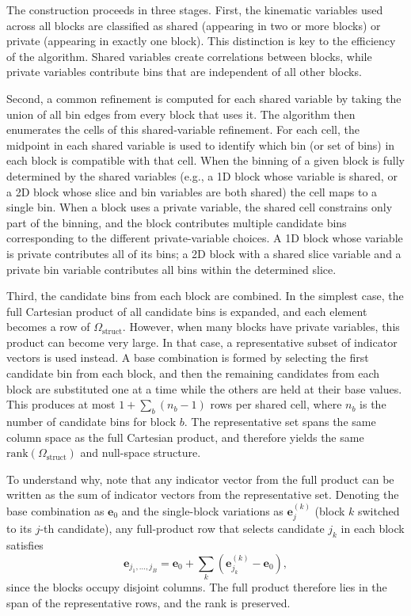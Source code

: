 \documentclass[a4paper,11pt]{article}
\begin{document}
The construction proceeds in three stages. First, the kinematic variables used across all blocks are classified as shared (appearing in two or more blocks) or private (appearing in exactly one block). This distinction is key to the efficiency of the algorithm. Shared variables create correlations between blocks, while private variables contribute bins that are independent of all other blocks.

Second, a common refinement is computed for each shared variable by taking the union of all bin edges from every block that uses it. The algorithm then enumerates the cells of this shared-variable refinement. For each cell, the midpoint in each shared variable is used to identify which bin (or set of bins) in each block is compatible with that cell. When the binning of a given block is fully determined by the shared variables (e.g., a 1D block whose variable is shared, or a 2D block whose slice and bin variables are both shared) the cell maps to a single bin. When a block uses a private variable, the shared cell constrains only part of the binning, and the block contributes multiple candidate bins corresponding to the different private-variable choices. A 1D block whose variable is private contributes all of its bins; a 2D block with a shared slice variable and a private bin variable contributes all bins within the determined slice.

Third, the candidate bins from each block are combined. In the simplest case, the full Cartesian product of all candidate bins is expanded, and each element becomes a row of $\Omega_\text{struct}$. However, when many blocks have private variables, this product can become very large. In that case, a representative subset of indicator vectors is used instead. A base combination is formed by selecting the first candidate bin from each block, and then the remaining candidates from each block are substituted one at a time while the others are held at their base values. This produces at most $1 + \sum_{b} (n_{b} - 1)$ rows per shared cell, where $n_{b}$ is the number of candidate bins for block $b$. The representative set spans the same column space as the full Cartesian product, and therefore yields the same $\mathrm{rank}(\Omega_\text{struct})$ and null-space structure.

To understand why, note that any indicator vector from the full product can be written as the sum of indicator vectors from the representative set. Denoting the base combination as $\mathbf{e}_{0}$ and the single-block variations as $\mathbf{e}_j^{(k)}$ (block $k$ switched to its $j$-th candidate), any full-product row that selects candidate $j_k$ in each block satisfies
\begin{equation}
    \mathbf{e}_{j_1, \ldots, j_B} = \mathbf{e}_{0} + \sum_k (\mathbf{e}_{j_{k}}^{(k)} - \mathbf{e}_{0}),
\end{equation}
since the blocks occupy disjoint columns. The full product therefore lies in the span of the representative rows, and the rank is preserved.
\end{document}

